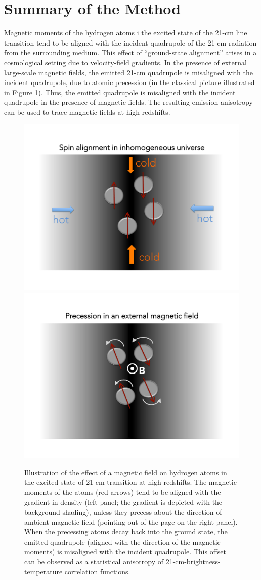 \section{Summary of the Method}
\label{sec:method}

Magnetic moments of the hydrogen atoms i the excited state of the 21-cm line transition tend to be aligned with the incident quadrupole of the 21-cm radiation from the surrounding medium. This effect of ``ground-state alignment'' arises in a cosmological setting due to velocity-field gradients. In the presence of external large-scale magnetic fields, the emitted 21-cm quadrupole is misaligned with the incident quadrupole, due to atomic precession (in the classical picture illustrated in Figure \ref{fig:precession}). Thus, the emitted quadrupole is misaligned with the incident quadrupole in the presence of magnetic fields. The resulting emission anisotropy can be used to trace magnetic fields at high redshifts.
\begin{figure}
\centering
\includegraphics[width=.35\textwidth,keepaspectratio=true]{Slide2.pdf}
\includegraphics[width=.35\textwidth,keepaspectratio=true]{Slide3.pdf}
\caption{Illustration of the effect of a magnetic field on hydrogen atoms in the excited state of 21-cm transition at high redshifts. The magnetic moments of the atoms (red arrows) tend to be aligned with the gradient in density (left panel; the gradient is depicted with the background shading), unless they precess about the direction of ambient magnetic field (pointing out of the page on the right panel). When the precessing atoms decay back into the ground state, the emitted quadrupole (aligned with the direction of the magnetic moments) is misaligned with the incident quadrupole. This offset can be observed as a statistical anisotropy of 21-cm-brightness-temperature correlation functions.\label{fig:precession}}
\end{figure}

